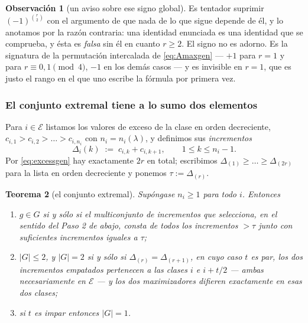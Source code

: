 \documentclass[11pt,reqno]{amsart}
\theoremstyle{plain}
\newtheorem{theorem}{Teorema}[section]
\theoremstyle{definition}
\newtheorem{remark}[theorem]{Observación}
\begin{document}
\begin{remark}[un aviso sobre ese signo global]
Es tentador suprimir $(-1)^{\binom r2}$ con el argumento de que nada de lo que sigue depende de él, y
lo anotamos por la razón contraria: una identidad enunciada es una identidad que se comprueba, y ésta
es \emph{falsa} sin él en cuanto $r\ge2$. El signo no es adorno. Es la signatura de la permutación
intercalada de \eqref{eq:Amaxgen} --- $+1$ para $r=1$ y para $r\equiv0,1 \pmod 4$, $-1$ en los demás
casos --- y es
invisible en $r=1$, que es justo el rango en el que uno escribe la fórmula por primera vez.
\end{remark}

\subsubsection*{El conjunto extremal tiene a lo sumo dos elementos}

Para $i\in\mathcal{E}$ listamos los valores de exceso de la clase en orden decreciente,
$c_{i,1}>c_{i,2}>\dots>c_{i,n_i}$ con $n_i=n_i(\lambda)$, y definimos sus \emph{incrementos}
\begin{equation}\label{eq:incrgen}
  \Delta_i(k)\;:=\;c_{i,k}+c_{i,k+1},\qquad 1\le k\le n_i-1 .
\end{equation}
Por \eqref{eq:excessgen} hay exactamente $2r$ en total; escribimos
$\Delta_{(1)}\ge\dots\ge\Delta_{(2r)}$ para la lista en orden decreciente y ponemos
$\tau:=\Delta_{(r)}$.

\begin{theorem}[el conjunto extremal]\label{thm:Ggen}
Supóngase $n_i\ge1$ para todo $i$. Entonces
\begin{enumerate}
\item[\rm(a)] $g\in G$ si y sólo si el multiconjunto de incrementos que selecciona, en el sentido del
Paso 2 de abajo, consta de todos los incrementos $>\tau$ junto con suficientes incrementos iguales a
$\tau$;
\item[\rm(b)] $|G|\le2$, y $|G|=2$ si y sólo si $\Delta_{(r)}=\Delta_{(r+1)}$, en cuyo caso $t$ es
par, los dos incrementos empatados pertenecen a las clases $i$ e $i+t/2$ --- ambas necesariamente en
$\mathcal{E}$ --- y los dos maximizadores difieren exactamente en esas dos clases;
\item[\rm(c)] si $t$ es impar entonces $|G|=1$.
\end{enumerate}
\end{theorem}
\end{document}
